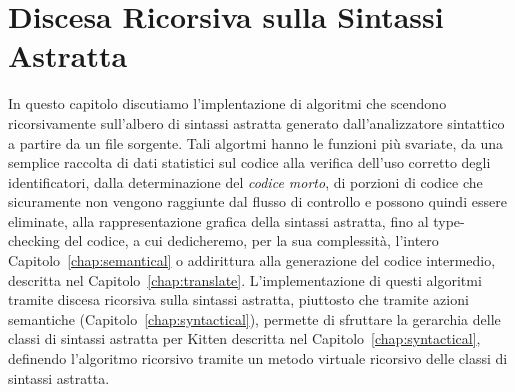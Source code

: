 \chapter{Discesa Ricorsiva sulla Sintassi Astratta}
  \label{chap:recursive_descent}
%
\begin{center}
\end{center}
%
In questo capitolo discutiamo l'implentazione di algoritmi che
scendono ricorsivamente sull'albero di sintassi astratta generato
dall'analizzatore sintattico a partire da un file sorgente. Tali algortmi
hanno le funzioni pi\`u svariate, da una semplice raccolta di dati statistici
sul codice alla verifica dell'uso corretto degli identificatori,
dalla determinazione del \emph{codice morto}, \cioe di porzioni di codice
che sicuramente non vengono raggiunte dal flusso di controllo e possono
quindi essere eliminate,
alla rappresentazione grafica della sintassi astratta, fino
al type-checking del codice, a cui dedicheremo,
per la sua complessit\`a, l'intero Capitolo~\ref{chap:semantical}
o addirittura alla generazione del codice intermedio,
descritta nel Capitolo~\ref{chap:translate}.
L'implementazione di questi algoritmi tramite discesa ricorsiva
sulla sintassi astratta, piuttosto
che tramite azioni semantiche (Capitolo~\ref{chap:syntactical}),
permette di sfruttare la gerarchia delle classi di sintassi astratta per
Kitten descritta nel Capitolo~\ref{chap:syntactical}, definendo l'algoritmo
ricorsivo tramite un metodo virtuale ricorsivo delle classi di sintassi
astratta.

